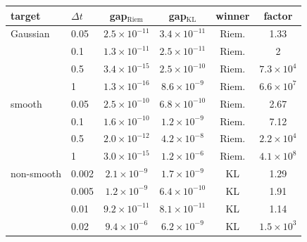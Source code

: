 \begin{tabular}{llcccc}
\toprule
target & $\Delta t$ & gap$_{\mathrm{Riem}}$ & gap$_{\mathrm{KL}}$ & winner & factor \\
\midrule
Gaussian & 0.05 & $2.5\times10^{-11}$ & $3.4\times10^{-11}$ & Riem. & 1.33 \\
 & 0.1 & $1.3\times10^{-11}$ & $2.5\times10^{-11}$ & Riem. & 2 \\
 & 0.5 & $3.4\times10^{-15}$ & $2.5\times10^{-10}$ & Riem. & $7.3\times10^{4}$ \\
 & 1 & $1.3\times10^{-16}$ & $8.6\times10^{-9}$ & Riem. & $6.6\times10^{7}$ \\
\midrule
smooth & 0.05 & $2.5\times10^{-10}$ & $6.8\times10^{-10}$ & Riem. & 2.67 \\
 & 0.1 & $1.6\times10^{-10}$ & $1.2\times10^{-9}$ & Riem. & 7.12 \\
 & 0.5 & $2.0\times10^{-12}$ & $4.2\times10^{-8}$ & Riem. & $2.2\times10^{4}$ \\
 & 1 & $3.0\times10^{-15}$ & $1.2\times10^{-6}$ & Riem. & $4.1\times10^{8}$ \\
\midrule
non-smooth & 0.002 & $2.1\times10^{-9}$ & $1.7\times10^{-9}$ & KL & 1.29 \\
 & 0.005 & $1.2\times10^{-9}$ & $6.4\times10^{-10}$ & KL & 1.91 \\
 & 0.01 & $9.2\times10^{-11}$ & $8.1\times10^{-11}$ & KL & 1.14 \\
 & 0.02 & $9.4\times10^{-6}$ & $6.2\times10^{-9}$ & KL & $1.5\times10^{3}$ \\
\bottomrule
\end{tabular}
